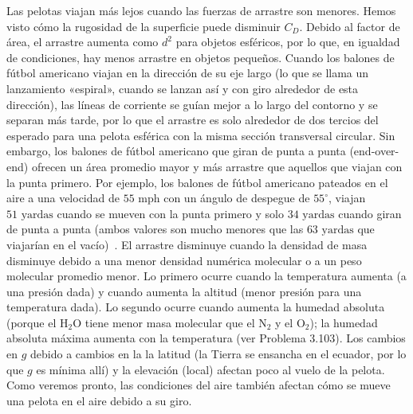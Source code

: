 \documentclass[12pt]{book}
\begin{document}
Las pelotas viajan más lejos cuando las fuerzas de arrastre son menores. Hemos visto cómo la rugosidad de la superficie puede disminuir $C_D$. Debido al factor de área, el arrastre aumenta como $d^2$ para objetos esféricos, por lo que, en igualdad de condiciones, hay menos arrastre en objetos pequeños. Cuando los balones de fútbol americano viajan en la dirección de su eje largo (lo que se llama un lanzamiento «espiral», cuando se lanzan así y con giro alrededor de esta dirección), las líneas de corriente se guían mejor a lo largo del contorno y se separan más tarde, por lo que el arrastre es solo alrededor de dos tercios del esperado para una pelota esférica con la misma sección transversal circular. Sin embargo, los balones de fútbol americano que giran de punta a punta (end-over-end) ofrecen un área promedio mayor y más arrastre que aquellos que viajan con la punta primero. Por ejemplo, los balones de fútbol americano pateados en el aire a una velocidad de $55\text{ mph}$ con un ángulo de despegue de $55^\circ$, viajan $51\text{ yardas}$ cuando se mueven con la punta primero y solo $34\text{ yardas}$ cuando giran de punta a punta (ambos valores son mucho menores que las $63\text{ yardas}$ que viajarían en el vacío)~\cite{ref16}. El arrastre disminuye cuando la densidad de masa disminuye debido a una menor densidad numérica molecular o a un peso molecular promedio menor. Lo primero ocurre cuando la temperatura aumenta (a una presión dada) y cuando aumenta la altitud (menor presión para una temperatura dada). Lo segundo ocurre cuando aumenta la humedad absoluta (porque el $\text{H}_2\text{O}$ tiene menor masa molecular que el $\text{N}_2$ y el $\text{O}_2$); la humedad absoluta máxima aumenta con la temperatura (ver Problema 3.103). Los cambios en $g$ debido a cambios en la la latitud (la Tierra se ensancha en el ecuador, por lo que $g$ es mínima allí) y la elevación (local) afectan poco al vuelo de la pelota. Como veremos pronto, las condiciones del aire también afectan cómo se mueve una pelota en el aire debido a su giro.
\end{document}
